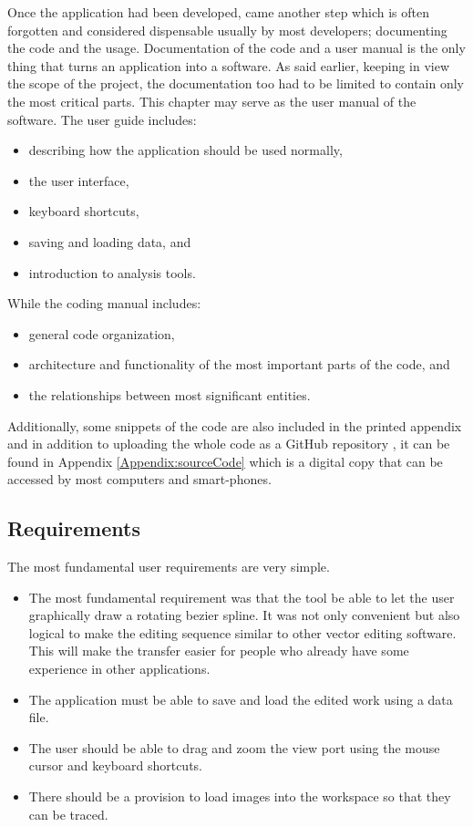 {    Once the application had been developed, came another step which is often forgotten and considered dispensable usually by most developers; documenting the code and the usage. Documentation of the code and a user manual is the only thing that turns an application into a software. As said earlier, keeping in view the scope of the project, the documentation too had to be limited to contain only the most critical parts. This chapter may serve as the user manual of the software. The user guide includes:
    \begin{itemize}
      \item describing how the application should be used normally,
      \item the user interface,
      \item keyboard shortcuts,
      \item saving and loading data, and
      \item introduction to analysis tools.
    \end{itemize}
    While the coding manual includes:
    \begin{itemize}
      \item general code organization,
      \item architecture and functionality of the most important parts of the code, and
      \item the relationships between most significant entities.
    \end{itemize}
    Additionally, some snippets of the code are also included in the printed appendix and in addition to uploading the whole code as a GitHub repository \cite{bib20}, it can be found in Appendix \ref{Appendix:sourceCode} which is a digital copy that can be accessed by most computers and smart-phones.
}
\subsection{Requirements}
{
    The most fundamental user requirements are very simple.
    \begin{itemize}
      \item
      {
        The most fundamental requirement was that the tool be able to let the user graphically draw a rotating bezier spline. It was not only convenient but also logical to make the editing sequence similar to other vector editing software. This will make the transfer easier for people who already have some experience in other applications.
      }
      \item
      {
        The application must be able to save and load the edited work using a data file.
      }
      \item
      {
        The user should be able to drag and zoom the view port using the mouse cursor and keyboard shortcuts.
      }
      \item
      {
        There should be a provision to load images into the workspace so that they can be traced.
      }
    \end{itemize}
}
